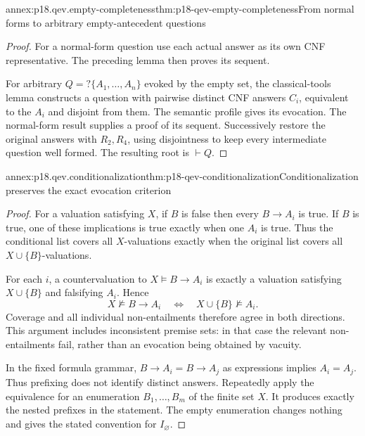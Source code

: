 \begin{annexitem}{annex:p18.qev.empty-completeness}{thm:p18-qev-empty-completeness}{From normal forms to arbitrary empty-antecedent questions}
\begin{proof}
For a normal-form question use each actual answer as its own CNF
representative. The preceding lemma then proves its sequent.

For arbitrary \(Q=?\{A_1,\ldots,A_n\}\) evoked by the empty
set, the classical-tools lemma constructs a question with pairwise
distinct CNF answers \(C_i\), equivalent to the \(A_i\) and
disjoint from them. The semantic profile gives its evocation. The
normal-form result supplies a proof of its sequent. Successively
restore the original answers with \(R_2,R_4\), using disjointness
to keep every intermediate question well formed. The resulting root
is \(\vdash Q\).
\end{proof}
\end{annexitem}

\begin{annexitem}{annex:p18.qev.conditionalization}{thm:p18-qev-conditionalization}{Conditionalization preserves the exact evocation criterion}
\begin{proof}
For a valuation satisfying \(X\), if \(B\) is false then every
\(B\to A_i\) is true. If \(B\) is true, one of these
implications is true exactly when one \(A_i\) is true. Thus the
conditional list covers all \(X\)-valuations exactly when the
original list covers all \(X\cup\{B\}\)-valuations.

For each \(i\), a countervaluation to
\(X\models B\to A_i\) is exactly a valuation satisfying
\(X\cup\{B\}\) and falsifying \(A_i\). Hence
\[
 X\not\models B\to A_i
 \quad\Longleftrightarrow\quad
 X\cup\{B\}\not\models A_i.
\]
Coverage and all individual non-entailments therefore agree in both
directions. This argument includes inconsistent premise sets: in that
case the relevant non-entailments fail, rather than an evocation being
obtained by vacuity.

In the fixed formula grammar, \(B\to A_i=B\to A_j\) as
expressions implies \(A_i=A_j\). Thus prefixing does not identify
distinct answers. Repeatedly apply the equivalence for an enumeration
\(B_1,\ldots,B_m\) of the finite set \(X\). It produces exactly
the nested prefixes in the statement. The empty enumeration changes
nothing and gives the stated convention for \(I_{\varnothing}\).
\end{proof}
\end{annexitem}

